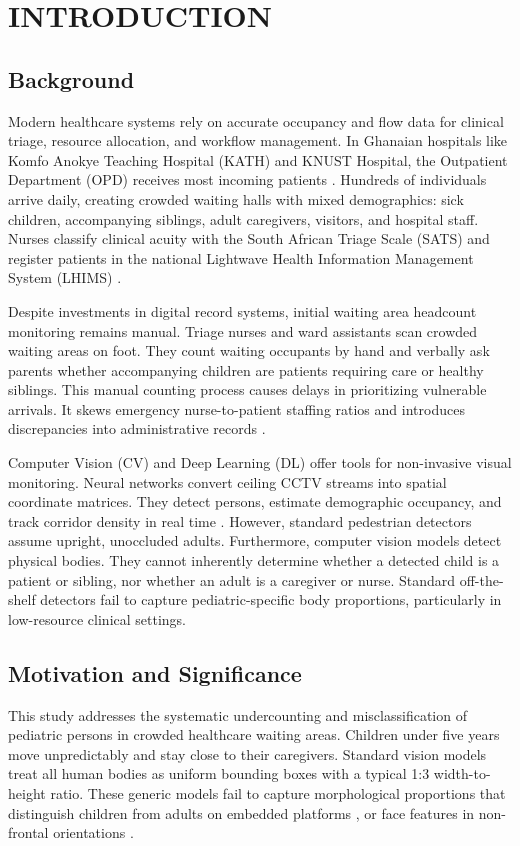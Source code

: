 \chapter{INTRODUCTION}

\section{Background}
Modern healthcare systems rely on accurate occupancy and flow data for clinical triage, resource allocation, and workflow management. In Ghanaian hospitals like Komfo Anokye Teaching Hospital (KATH) and KNUST Hospital, the Outpatient Department (OPD) receives most incoming patients \cite{osei2024}. Hundreds of individuals arrive daily, creating crowded waiting halls with mixed demographics: sick children, accompanying siblings, adult caregivers, visitors, and hospital staff. Nurses classify clinical acuity with the South African Triage Scale (SATS) and register patients in the national Lightwave Health Information Management System (LHIMS) \cite{addotey2023}.

Despite investments in digital record systems, initial waiting area headcount monitoring remains manual. Triage nurses and ward assistants scan crowded waiting areas on foot. They count waiting occupants by hand and verbally ask parents whether accompanying children are patients requiring care or healthy siblings. This manual counting process causes delays in prioritizing vulnerable arrivals. It skews emergency nurse-to-patient staffing ratios and introduces discrepancies into administrative records \cite{keles2023, javaid2024}.

Computer Vision (CV) and Deep Learning (DL) offer tools for non-invasive visual monitoring. Neural networks convert ceiling CCTV streams into spatial coordinate matrices. They detect persons, estimate demographic occupancy, and track corridor density in real time \cite{diop2025, jiang2022}. However, standard pedestrian detectors assume upright, unoccluded adults. Furthermore, computer vision models detect physical bodies. They cannot inherently determine whether a detected child is a patient or sibling, nor whether an adult is a caregiver or nurse. Standard off-the-shelf detectors fail to capture pediatric-specific body proportions, particularly in low-resource clinical settings.

\section{Motivation and Significance}
This study addresses the systematic undercounting and misclassification of pediatric persons in crowded healthcare waiting areas. Children under five years move unpredictably and stay close to their caregivers. Standard vision models treat all human bodies as uniform bounding boxes with a typical 1:3 width-to-height ratio. These generic models fail to capture morphological proportions that distinguish children from adults on embedded platforms \cite{lin2022}, or face features in non-frontal orientations \cite{liu2020}.

